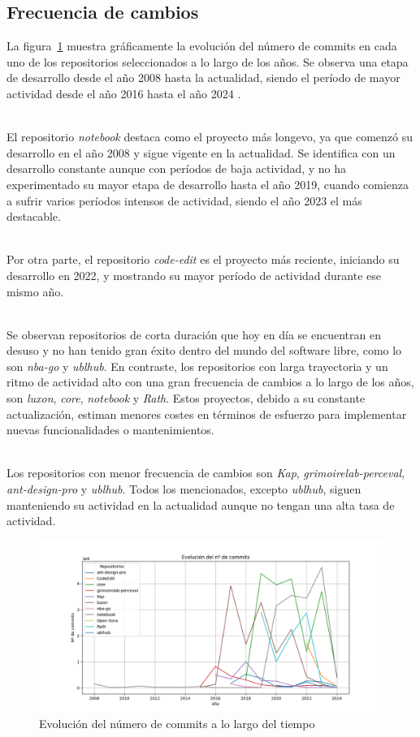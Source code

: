 \documentclass[a4paper, 12pt]{book}
\begin{document}
\subsection{Frecuencia de cambios}
\label{subsec:commits}

La figura~\ref{fig:grafica-commits} muestra gráficamente la evolución del número de commits en cada uno de los repositorios seleccionados a lo largo de los años. Se observa una etapa de
desarrollo desde el año 2008 hasta la actualidad, siendo el período de mayor actividad desde el año 2016 hasta el año 2024 .

\\El repositorio \textit{notebook} destaca como el proyecto más longevo, ya que comenzó su desarrollo en el año 2008 y sigue vigente en la actualidad.
Se identifica con un desarrollo constante aunque con períodos de baja actividad, y no ha experimentado su mayor etapa de desarrollo hasta el año 2019, cuando comienza a sufrir varios períodos intensos de actividad,
siendo el año 2023 el más destacable.

\\Por otra parte, el repositorio \textit{code-edit} es el proyecto más reciente, iniciando su desarrollo en 2022, y mostrando su mayor período de actividad durante ese mismo año.

\\Se observan repositorios de corta duración que hoy en día se encuentran en desuso y  no han tenido gran éxito dentro del mundo del software libre, como lo son \textit{nba-go} y \textit{ublhub}.
En contraste, los repositorios con larga trayectoria y un ritmo de actividad alto con una gran frecuencia de cambios a lo largo de los años, son \textit{luxon}, \textit{core}, \textit{notebook} y
\textit{Rath}. Estos proyectos, debido a su constante actualización, estiman menores costes en términos de esfuerzo para implementar nuevas funcionalidades o mantenimientos.

\\Los repositorios con menor frecuencia de cambios son \textit{Kap}, \textit{grimoirelab-perceval}, \textit{ant-design-pro} y \textit{ublhub}. Todos los mencionados, excepto \textit{ublhub}, siguen
manteniendo su actividad en la actualidad aunque no tengan una alta tasa de actividad.


\begin{figure}
  \centering
  \includegraphics[width=16cm, keepaspectratio]{img/commits_graph.png}
  \caption{Evolución del número de commits a lo largo del tiempo}
  \label{fig:grafica-commits}
\end{figure}
\end{document}

